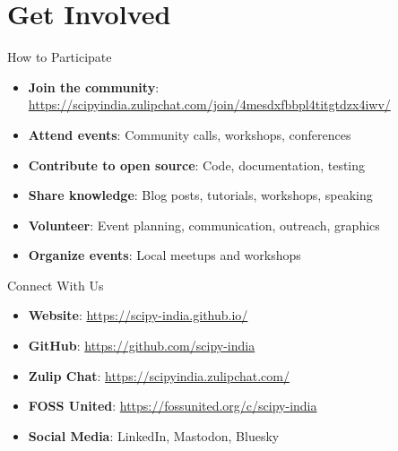 \documentclass[16pt,t]{beamer}
\begin{document}
\section{Get Involved}

\begin{frame}{How to Participate}
\begin{itemize}
    \item \textbf{Join the community}: \url{https://scipyindia.zulipchat.com/join/4mesdxfbbpl4titgtdzx4iwv/}
    \item \textbf{Attend events}: Community calls, workshops, conferences
    \item \textbf{Contribute to open source}: Code, documentation, testing
    \item \textbf{Share knowledge}: Blog posts, tutorials, workshops, speaking
    \item \textbf{Volunteer}: Event planning, communication, outreach, graphics
    \item \textbf{Organize events}: Local meetups and workshops
\end{itemize}
\end{frame}

\begin{frame}{Connect With Us}
\begin{itemize}
    \item \textbf{Website}: \url{https://scipy-india.github.io/}
    \item \textbf{GitHub}: \url{https://github.com/scipy-india}
    \item \textbf{Zulip Chat}: \url{https://scipyindia.zulipchat.com/}
    \item \textbf{FOSS United}: \url{https://fossunited.org/c/scipy-india}
    \item \textbf{Social Media}: LinkedIn, Mastodon, Bluesky
\end{itemize}
\end{frame}
\end{document}
